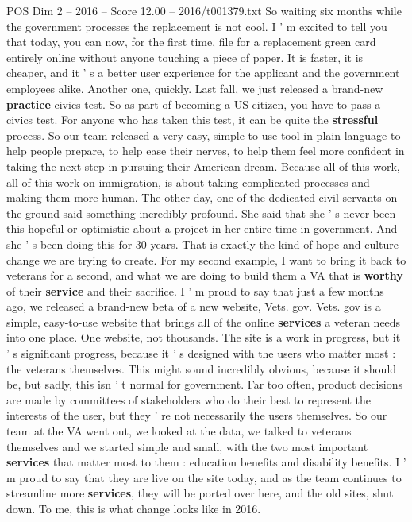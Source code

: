 \begin{textsample}{POS Dim 2 – 2016 – Score 12.00 – 2016/t001379.txt}
So waiting six months while the government processes the replacement is not cool.
I ' m excited to tell you that today, you can now, for the first time, file for a replacement green card entirely online without anyone touching a piece of paper.
It is faster, it is cheaper, and it ' s a better user experience for the applicant and the government employees alike.
Another one, quickly.
Last fall, we just released a brand-new \textbf{practice} civics test.
So as part of becoming a US citizen, you have to pass a civics test.
For anyone who has taken this test, it can be quite the \textbf{stressful} process.
So our team released a very easy, simple-to-use tool in plain language to help people prepare, to help ease their nerves, to help them feel more confident in taking the next step in pursuing their American dream.
Because all of this work, all of this work on immigration, is about taking complicated processes and making them more human.
The other day, one of the dedicated civil servants on the ground said something incredibly profound.
She said that she ' s never been this hopeful or optimistic about a project in her entire time in government.
And she ' s been doing this for 30 years.
That is exactly the kind of hope and culture change we are trying to create.
For my second example, I want to bring it back to veterans for a second, and what we are doing to build them a VA that is \textbf{worthy} of their \textbf{service} and their sacrifice.
I ' m proud to say that just a few months ago, we released a brand-new beta of a new website, Vets. gov.
Vets. gov is a simple, easy-to-use website that brings all of the online \textbf{services} a veteran needs into one place.
One website, not thousands.
The site is a work in progress, but it ' s significant progress, because it ' s designed with the users who matter most : the veterans themselves.
This might sound incredibly obvious, because it should be, but sadly, this isn ' t normal for government.
Far too often, product decisions are made by committees of stakeholders who do their best to represent the interests of the user, but they ' re not necessarily the users themselves.
So our team at the VA went out, we looked at the data, we talked to veterans themselves and we started simple and small, with the two most important \textbf{services} that matter most to them : education benefits and disability benefits.
I ' m proud to say that they are live on the site today, and as the team continues to streamline more \textbf{services}, they will be ported over here, and the old sites, shut down.
To me, this is what change looks like in 2016.

\end{textsample}
